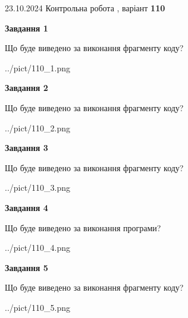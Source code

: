 \documentclass[12pt, ukrainian]{article}
\begin{document}
{\Large{23.10.2024 Контрольна робота , варіант  \No \textbf { 110 }\par}}
{
\begin {large}
{\begin {center}\textbf{Завдання 1}\end {center}}

Що буде виведено за виконання фрагменту коду?\par
\begin{center}
	{../pict/110_1.png}
\end{center}
\newpage

{\begin {center}\textbf{Завдання 2}\end {center}}

Що буде виведено за виконання фрагменту коду?\par
\begin{center}
	{../pict/110_2.png}
\end{center}
\newpage

{\begin {center}\textbf{Завдання 3}\end {center}}

Що буде виведено за виконання фрагменту коду?\par
\begin{center}
	{../pict/110_3.png}
\end{center}
\newpage

{\begin {center}\textbf{Завдання 4}\end {center}}

Що буде виведено за виконання програми?\par
\begin{center}
	{../pict/110_4.png}
\end{center}
\newpage

{\begin {center}\textbf{Завдання 5}\end {center}}

Що буде виведено за виконання фрагменту коду?\par
\begin{center}
	{../pict/110_5.png}
\end{center}
\newpage


\end{large}}
\end{document}
